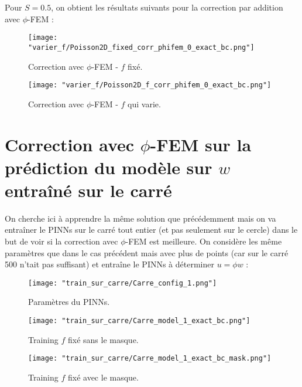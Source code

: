 Pour $S=0.5$, on obtient les résultats suivants pour la correction par addition avec $\phi$-FEM :

\begin{minipage}{0.48\linewidth}
	\begin{figure}[H]
		\centering
		\texttt{[image: "varier\_f/Poisson2D\_fixed\_corr\_phifem\_0\_exact\_bc.png"]}
		\caption{Correction avec $\phi$-FEM - $f$ fixé.}
		\label{Poisson2D_fixed_corr_phifem_0_exact_bc}
	\end{figure}
\end{minipage}
\begin{minipage}{0.48\linewidth}
	\begin{figure}[H]
		\centering
		\texttt{[image: "varier\_f/Poisson2D\_f\_corr\_phifem\_0\_exact\_bc.png"]}
		\caption{Correction avec $\phi$-FEM - $f$ qui varie.}
		\label{Poisson2D_f_corr_phifem_0_exact_bc}
	\end{figure}
\end{minipage}

\newpage

\section{Correction avec $\phi$-FEM sur la prédiction du modèle sur $w$ entraîné sur le carré}

On cherche ici à apprendre la même solution que précédemment mais on va entraîner le PINNs sur le carré tout entier (et pas seulement sur le cercle) dans le but de voir si la correction avec $\phi$-FEM est meilleure. On considère les même paramètres que dans le cas précédent mais avec plus de points (car sur le carré 500 n'tait pas suffisant) et entraîne le PINNs à déterminer $u=\phi w$ :

\begin{figure}[H]
	\centering
	\texttt{[image: "train\_sur\_carre/Carre\_config\_1.png"]}
	\caption{Paramètres du PINNs.}
	\label{config_1}
\end{figure}

\begin{minipage}{0.48\linewidth}
	\begin{figure}[H]
		\centering
		\texttt{[image: "train\_sur\_carre/Carre\_model\_1\_exact\_bc.png"]}
		\caption{Training $f$ fixé sans le masque.}
		\label{Carre_model_1_exact_bc}
	\end{figure}
\end{minipage}
\begin{minipage}{0.48\linewidth}
	\begin{figure}[H]
		\centering
		\texttt{[image: "train\_sur\_carre/Carre\_model\_1\_exact\_bc\_mask.png"]}
		\caption{Training $f$ fixé avec le masque.}
		\label{Carre_model_1_exact_bc_mask}
	\end{figure}
\end{minipage}

